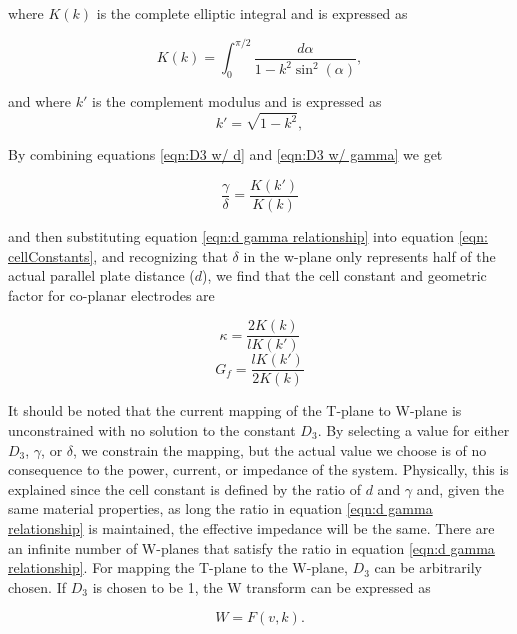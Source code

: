 \noindent where $K(k)$ is the complete elliptic integral and is expressed as 

 \begin{equation}
     K(k) = \int_0^{\pi/2} \frac{d\alpha}{1 - k^2\sin^2(\alpha)},
 \end{equation}
 
 \noindent and where $k'$ is the complement modulus and is expressed as 
 \begin{equation}
     k' = \sqrt{1-k^2},
 \end{equation}

\noindent By combining equations \ref{eqn:D3 w/ d} and \ref{eqn:D3 w/ gamma} we get

\begin{equation}
    \frac{\gamma}{\delta} = \frac{K(k')}{K(k)}
    \label{eqn:d gamma relationship}
\end{equation}

\noindent and then substituting equation \ref{eqn:d gamma relationship} into equation \ref{eqn: cellConstants}, and recognizing that $\delta$ in the w-plane only represents half of the actual parallel plate distance ($d$), we find that the cell constant and geometric factor for co-planar electrodes are 

\begin{equation}
    \kappa = \frac{2K(k)}{lK(k')}
    \label{eqn: cellConstantSolution}
\end{equation}
\begin{equation}
    G_f = \frac{lK(k')}{2K(k)}
\end{equation}

\par It should be noted that the current mapping of the T-plane to W-plane is unconstrained with no solution to the constant $D_3$. By selecting a value for either $D_3$, $\gamma$, or $\delta$, we constrain the mapping, but the actual value we choose is of no consequence to the power, current, or impedance of the system. Physically, this is explained since the cell constant is defined by the ratio of $d$ and $\gamma$ and, given the same material properties, as long the ratio in equation \ref{eqn:d gamma relationship} is maintained, the effective impedance will be the same. There are an infinite number of W-planes that satisfy the ratio in equation \ref{eqn:d gamma relationship}. For mapping the T-plane to the W-plane, $D_3$ can be arbitrarily chosen. If $D_3$ is chosen to be 1, the W transform can be expressed as 

\begin{equation}
    W = F(v,k).
    \label{eqn: w_mapping}
\end{equation}

